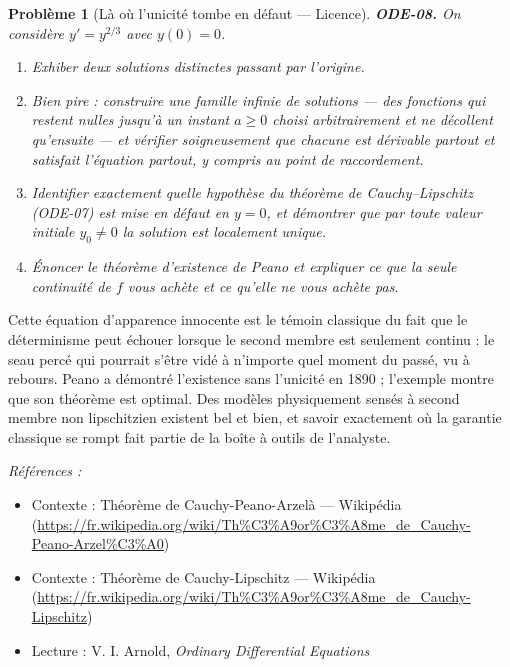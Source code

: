 \documentclass[11pt]{article}
\newtheorem{problem}{Problème}
\newenvironment{refs}{\par\small\noindent\emph{Références :}\begin{itemize}\setlength\itemsep{0pt}}{\end{itemize}\normalsize}
\begin{document}
\begin{problem}[{Là où l'unicité tombe en défaut --- Licence}]
\textbf{ODE-08.} On considère $ y' = y^{2/3} $ avec $ y(0) = 0 $.
\begin{enumerate}
\item[(a)] Exhiber deux solutions distinctes passant par l'origine.
\item[(b)] Bien pire : construire une famille infinie de solutions --- des fonctions qui restent nulles
jusqu'à un instant $ a \ge 0 $ choisi arbitrairement et ne décollent qu'ensuite --- et vérifier
soigneusement que chacune est dérivable partout et satisfait l'équation partout, y compris au
point de raccordement.
\item[(c)] Identifier exactement quelle hypothèse du théorème de Cauchy--Lipschitz (ODE-07) est mise en
défaut en $ y = 0 $, et démontrer que par toute valeur initiale $ y_0 \ne 0 $ la solution
\textit{est} localement unique.
\item[(d)] Énoncer le théorème d'existence de Peano et expliquer ce que la seule continuité de $ f $
vous achète et ce qu'elle ne vous achète pas.
\end{enumerate}

\end{problem}

\noindent Cette équation d'apparence innocente est le témoin classique du fait que le
déterminisme peut échouer lorsque le second membre est seulement continu : le seau percé qui
pourrait s'être vidé à n'importe quel moment du passé, vu à rebours. Peano a démontré l'existence
sans l'unicité en 1890 ; l'exemple montre que son théorème est optimal. Des modèles physiquement
sensés à second membre non lipschitzien existent bel et bien, et savoir exactement où la garantie
classique se rompt fait partie de la boîte à outils de l'analyste.

\begin{refs}
\item Contexte : Théorème de Cauchy-Peano-Arzelà --- Wikipédia (\url{https://fr.wikipedia.org/wiki/Th%C3%A9or%C3%A8me_de_Cauchy-Peano-Arzel%C3%A0})
\item Contexte : Théorème de Cauchy-Lipschitz --- Wikipédia (\url{https://fr.wikipedia.org/wiki/Th%C3%A9or%C3%A8me_de_Cauchy-Lipschitz})
\item Lecture : V. I. Arnold, \textit{Ordinary Differential Equations}
\end{refs}

\bigskip
\end{document}
